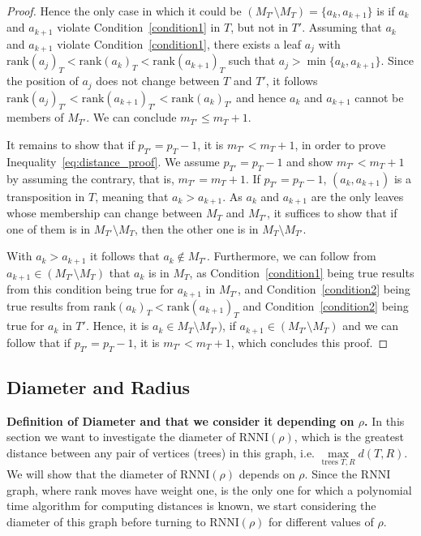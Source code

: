 \documentclass[11pt]{amsart}
\newcommand{\rnni}{\mathrm{RNNI}}
\newcommand{\rank}{\mathrm{rank}}
\newcommand{\summary}[1]{\textbf{#1}} %
\begin{document}
\begin{proof}
	Hence the only case in which it could be $(M_{T'} \setminus M_T) = \{a_k, a_{k+1}\}$ is if $a_k$ and $a_{k+1}$ violate Condition~\ref{condition1} in $T$, but not in $T'$.
	Assuming that $a_k$ and $a_{k+1}$ violate Condition~\ref{condition1}, there exists a leaf $a_j$ with $\rank(a_j)_T < \rank(a_k)_T < \rank(a_{k+1})_T$ such that $a_j > \min\{a_k,a_{k+1}\}$.
	Since the position of $a_j$ does not change between $T$ and $T'$, it follows $\rank(a_j)_{T'} < \rank(a_{k+1})_{T'} < \rank(a_{k})_{T'}$ and hence $a_k$ and $a_{k+1}$ cannot be members of $M_{T'}$.
	We can conclude $m_{T'} \leq m_T + 1$.

	It remains to show that if $p_{T'} = p_T - 1$, it is $m_{T'} < m_T + 1$, in order to prove Inequality~\ref{eq:distance_proof}.
	We assume $p_{T'} = p_T - 1$ and show $m_{T'} < m_T + 1$ by assuming the contrary, that is, $m_{T'} = m_T + 1$.
	If $p_{T'} = p_T - 1$, $(a_k, a_{k+1})$ is a transposition in $T$, meaning that $a_k > a_{k+1}$.
	As $a_k$ and $a_{k+1}$ are the only leaves whose membership can change between $M_T$ and $M_{T'}$, it suffices to show that if one of them is in $M_{T'} \setminus M_T$, then the other one is in $M_T \setminus M_{T'}$.

	With $a_k > a_{k+1}$ it follows that $a_k \notin M_{T'}$.
	Furthermore, we can follow from $a_{k+1} \in (M_{T'} \setminus M_T)$ that $a_k$ is in $M_T$, as Condition~\ref{condition1} being true results from this condition being true for $a_{k+1}$ in $M_{T'}$, and Condition~\ref{condition2} being true results from $\rank(a_k)_T < \rank(a_{k+1})_T$ and Condition~\ref{condition2} being true for $a_k$ in $T'$.
	Hence, it is $a_k \in M_T \setminus M_{T'})$, if $a_{k+1} \in (M_{T'} \setminus M_T)$ and we can follow that if $p_{T'} = p_T - 1$, it is $m_{T'} < m_T + 1$, which concludes this proof.
\end{proof}

\subsection{Diameter and Radius}

\summary{Definition of Diameter and that we consider it depending on $\rho$.}
In this section we want to investigate the diameter of $\rnni(\rho)$, which is the greatest distance between any pair of vertices (trees) in this graph, i.e. $\max\limits_{\text{trees }T,R}d(T,R)$.
We will show that the diameter of $\rnni(\rho)$ depends on $\rho$.
Since the $\rnni$ graph, where rank moves have weight one, is the only one for which a polynomial time algorithm for computing distances is known, we start considering the diameter of this graph before turning to $\rnni(\rho)$ for different values of $\rho$.
\end{document}

